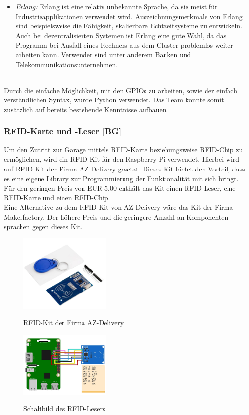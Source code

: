 \begin{itemize}
  \item \textit{Erlang: } Erlang ist eine relativ unbekannte Sprache, da sie meist für Industrieapplikationen verwendet wird. Auszeichnungsmerkmale von Erlang sind beispielsweise die Fähigkeit, skalierbare Echtzeitsysteme zu entwickeln. Auch bei dezentralisierten Systemen ist Erlang eine gute Wahl, da das Programm bei Ausfall eines Rechners aus dem Cluster problemlos weiter arbeiten kann. Verwender sind unter anderem Banken und Telekommunikationsunternehmen.
\end{itemize}
\cite{RaspberryProgramming}\\
Durch die einfache Möglichkeit, mit den GPIOs zu arbeiten, sowie der einfach verständlichen Syntax, wurde Python verwendet. Das Team konnte somit zusätzlich auf bereits bestehende Kenntnisse aufbauen.

\subsubsection{RFID-Karte und -Leser [BG]}

Um den Zutritt zur Garage mittels RFID-Karte beziehungsweise RFID-Chip zu ermöglichen, wird ein RFID-Kit für den Raspberry Pi verwendet. Hierbei wird auf RFID-Kit der Firma AZ-Delivery gesetzt. Dieses Kit bietet den Vorteil, dass es eine eigene Library zur Programmierung der Funktionalität mit sich bringt. Für den geringen Preis von EUR 5,00 enthält das Kit einen RFID-Leser, eine RFID-Karte und einen RFID-Chip.
\cite{RFIDaz}\\

Eine Alternative zu dem RFID-Kit von AZ-Delivery wäre das Kit der Firma Makerfactory. Der höhere Preis und die geringere Anzahl an Komponenten sprachen gegen dieses Kit.
\cite{RFIDalternative}

\begin{figure}[H]
  \centering
  \includegraphics[width=0.4\textwidth]{pics/RFID-Kit-AZ.png}
  \caption{RFID-Kit der Firma AZ-Delivery}
  \cite{RFIDaz}
\end{figure}

\begin{figure}[H]
  \centering
  \includegraphics[width=0.4\textwidth]{pics/RFID-Schaltbild.png}
  \caption{Schaltbild des RFID-Lesers}
  \cite{RFIDschaltbild}
\end{figure}

